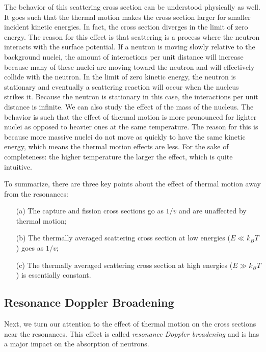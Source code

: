 The behavior of this scattering cross section can be understood physically as well. It goes such that the thermal motion makes the cross section larger for smaller incident kinetic energies. In fact, the cross section diverges in the limit of zero energy. The reason for this effect is that scattering is a process where the neutron interacts with the surface potential. If a neutron is moving slowly relative to the background nuclei, the amount of interactions per unit distance will increase because many of these nuclei are moving toward the neutron and will effectively collide with the neutron. In the limit of zero kinetic energy, the neutron is stationary and eventually a scattering reaction will occur when the nucleus strikes it. Because the neutron is stationary in this case, the interactions per unit distance is infinite. We can also study the effect of the mass of the nucleus. The behavior is such that the effect of thermal motion is more pronounced for lighter nuclei as opposed to heavier ones at the same temperature. The reason for this is because more massive nuclei do not move as quickly to have the same kinetic energy, which means the thermal motion effects are less. For the sake of completeness: the higher temperature the larger the effect, which is quite intuitive.

To summarize, there are three key points about the effect of thermal motion away from the resonances:
\begin{enumerate}
  \item[(a)] The capture and fission cross sections go as $1/v$ and are unaffected by thermal motion;
  \item[(b)] The thermally averaged scattering cross section at low energies ($E \ll k_B T$) goes as $1/v$;
  \item[(c)] The thermally averaged scattering cross section at high energies ($E \gg k_B T$) is essentially constant.
\end{enumerate}

\subsection{Resonance Doppler Broadening} \label{Sec:nuclearData_resonanceDopplerBroadening}

Next, we turn our attention to the effect of thermal motion on the cross sections near the resonances. This effect is called \emph{resonance Doppler broadening} and is has a major impact on the absorption of neutrons.

